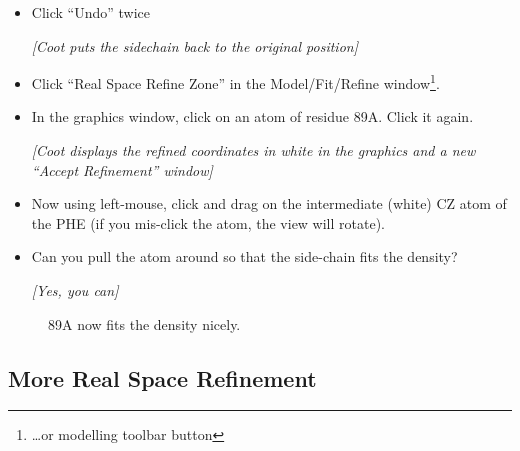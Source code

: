 \documentclass{article}
\begin{document}
\begin{itemize}
\item Click \textsf{``Undo''} twice

  \textsl{ [Coot puts the sidechain back to the original position] } 
  
\item Click \textsf{``Real Space Refine Zone''} in the
  Model/Fit/Refine window\footnote{\ldots or modelling toolbar button}.
  
\item In the graphics window, click on an atom of residue 89A.  Click
  it again.

  \textsl{ [Coot displays the refined coordinates in white in the
    graphics and a new ``Accept Refinement'' window]}
  
\item Now using left-mouse, click and drag on the intermediate (white)
  CZ atom of the PHE (if you mis-click the atom, the view will
  rotate).
  
\item Can you pull the atom around so that the side-chain fits the
  density?

  \emph{ [Yes, you can] } 

\end{itemize}
  
  \begin{figure}[htbp]
    \begin{center}
      \leavevmode
      \epsfxsize 70mm
      \caption{89A now fits the density nicely.}
      \label{fig:89a-coot}
    \end{center}
  \end{figure}

\subsection{More Real Space Refinement}
\end{document}

